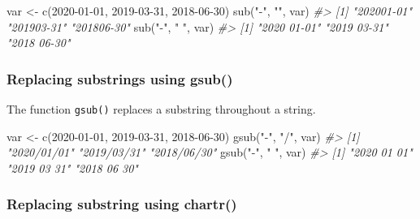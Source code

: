 \documentclass[
]{book}
\newenvironment{Shaded}{\begin{snugshade}}{\end{snugshade}}
\newcommand{\CommentTok}[1]{\textcolor[rgb]{0.56,0.35,0.01}{\textit{#1}}}
\newcommand{\FunctionTok}[1]{\textcolor[rgb]{0.00,0.00,0.00}{#1}}
\newcommand{\NormalTok}[1]{#1}
\newcommand{\OtherTok}[1]{\textcolor[rgb]{0.56,0.35,0.01}{#1}}
\newcommand{\StringTok}[1]{\textcolor[rgb]{0.31,0.60,0.02}{#1}}
\begin{document}
\begin{Shaded}
\begin{Highlighting}[]
\NormalTok{var }\OtherTok{\textless{}{-}} \FunctionTok{c}\NormalTok{(}\StringTok{\textquotesingle{}2020{-}01{-}01\textquotesingle{}}\NormalTok{, }\StringTok{\textquotesingle{}2019{-}03{-}31\textquotesingle{}}\NormalTok{, }\StringTok{\textquotesingle{}2018{-}06{-}30\textquotesingle{}}\NormalTok{)}
\FunctionTok{sub}\NormalTok{(}\StringTok{"{-}"}\NormalTok{, }\StringTok{""}\NormalTok{, var)}
\CommentTok{\#\textgreater{} [1] "202001{-}01" "201903{-}31" "201806{-}30"}
\FunctionTok{sub}\NormalTok{(}\StringTok{"{-}"}\NormalTok{, }\StringTok{" "}\NormalTok{, var)}
\CommentTok{\#\textgreater{} [1] "2020 01{-}01" "2019 03{-}31" "2018 06{-}30"}
\end{Highlighting}
\end{Shaded}

\hypertarget{replacing-substrings-using-gsub}{%
\subsubsection{Replacing substrings using gsub()}\label{replacing-substrings-using-gsub}}

The function \texttt{gsub()} replaces a substring throughout a string.

\begin{Shaded}
\begin{Highlighting}[]
\NormalTok{var }\OtherTok{\textless{}{-}} \FunctionTok{c}\NormalTok{(}\StringTok{\textquotesingle{}2020{-}01{-}01\textquotesingle{}}\NormalTok{, }\StringTok{\textquotesingle{}2019{-}03{-}31\textquotesingle{}}\NormalTok{, }\StringTok{\textquotesingle{}2018{-}06{-}30\textquotesingle{}}\NormalTok{)}
\FunctionTok{gsub}\NormalTok{(}\StringTok{"{-}"}\NormalTok{, }\StringTok{"/"}\NormalTok{, var)}
\CommentTok{\#\textgreater{} [1] "2020/01/01" "2019/03/31" "2018/06/30"}
\FunctionTok{gsub}\NormalTok{(}\StringTok{"{-}"}\NormalTok{, }\StringTok{" "}\NormalTok{, var)}
\CommentTok{\#\textgreater{} [1] "2020 01 01" "2019 03 31" "2018 06 30"}
\end{Highlighting}
\end{Shaded}

\hypertarget{replacing-substring-using-chartr}{%
\subsubsection{Replacing substring using chartr()}\label{replacing-substring-using-chartr}}
\end{document}
